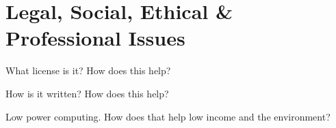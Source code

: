 \chapter{Legal, Social, Ethical \& Professional Issues}

What license is it?
How does this help?

How is it written?
How does this help?

Low power computing.
How does that help low income and the environment?